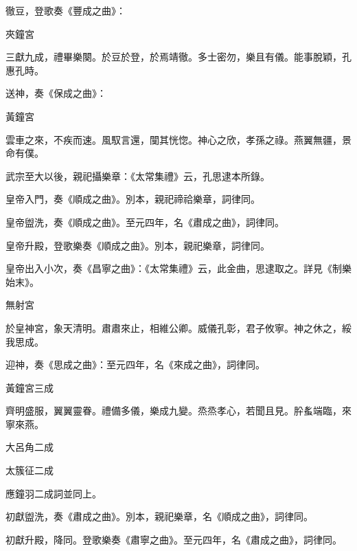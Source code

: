 \begin{pinyinscope}
 徹豆，登歌奏《豐成之曲》：



 夾鐘宮



 三獻九成，禮畢樂闋。於豆於登，於焉靖徹。多士密勿，樂且有儀。能事脫穎，孔惠孔時。



 送神，奏《保成之曲》：



 黃鐘宮



 雲車之來，不疾而速。風馭言還，闃其恍惚。神心之欣，孝孫之祿。燕翼無疆，景命有僕。



 武宗至大以後，親祀攝樂章：《太常集禮》云，孔思逮本所錄。



 皇帝入門，奏《順成之曲》。別本，親祀禘祫樂章，詞律同。



 皇帝盥洗，奏《順成之曲》。至元四年，名《肅成之曲》，詞律同。



 皇帝升殿，登歌樂奏《順成之曲》。別本，親祀樂章，詞律同。



 皇帝出入小次，奏《昌寧之曲》：《太常集禮》云，此金曲，思逮取之。詳見《制樂始末》。



 無射宮



 於皇神宮，象天清明。肅肅來止，相維公卿。威儀孔彰，君子攸寧。神之休之，綏我思成。



 迎神，奏《思成之曲》：至元四年，名《來成之曲》，詞律同。



 黃鐘宮三成



 齊明盛服，翼翼靈眷。禮備多儀，樂成九變。烝烝孝心，若聞且見。肸蚃端臨，來寧來燕。



 大呂角二成



 太簇征二成



 應鐘羽二成詞並同上。



 初獻盥洗，奏《肅成之曲》。別本，親祀樂章，名《順成之曲》，詞律同。



 初獻升殿，降同。登歌樂奏《肅寧之曲》。至元四年，名《肅成之曲》，詞律同。




\end{pinyinscope}
